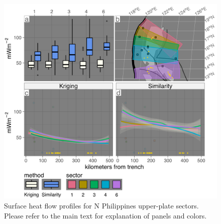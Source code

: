 \begin{figure}[htbp]

{\centering \includegraphics[width=1\linewidth,]{assets/figs/chpt3/NPhilippinesUpperPlate} 

}

\caption[Surface heat flow profiles for N Philippines upper-plate sectors]{Surface heat flow profiles for N Philippines upper-plate sectors. Please refer to the main text for explanation of panels and colors.}\label{fig:nPhilippinesUpper}
\end{figure}

